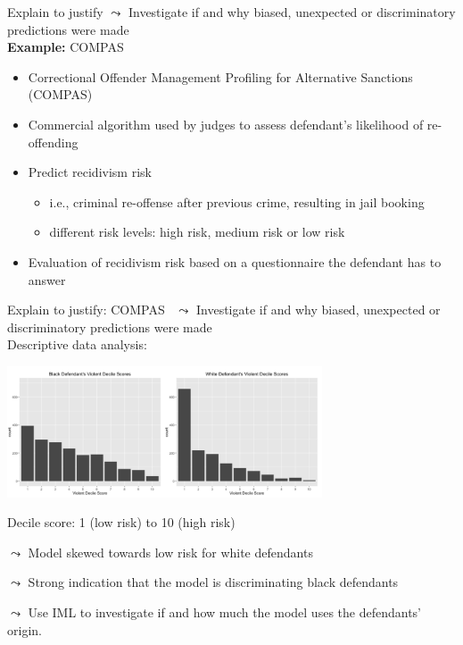 \documentclass[11pt,compress,t,notes=noshow, aspectratio=169, xcolor=table]{beamer}
\begin{document}
\begin{frame}{Explain to justify}
    $\leadsto$ Investigate if and why biased, unexpected or discriminatory predictions were made \\
    \bigskip
    \textbf{Example:} COMPAS
    \smallskip
    \begin{itemize}
        \item Correctional Offender Management Profiling for Alternative Sanctions (COMPAS)
        \smallskip
        \item Commercial algorithm used by judges to assess defendant’s likelihood of re-offending
        \pause
        \smallskip
        \item Predict recidivism risk
        \begin{itemize}
            \item i.e., criminal re-offense after previous crime, resulting in jail booking
            \smallskip
            \item different risk levels: high risk, medium risk or low risk
        \end{itemize}
        \pause
        \smallskip
        \item Evaluation of recidivism risk based on a questionnaire the defendant has to answer
    \end{itemize}

\end{frame}

\begin{frame}{Explain to justify: COMPAS~}
    $\leadsto$ Investigate if and why biased, unexpected or discriminatory predictions were made \\
    \medskip
    Descriptive data analysis: 
    
    \centering
    \includegraphics[width=0.7\textwidth]{figure/compass_black_white.PNG}

    Decile score: 1 (low risk) to 10 (high risk)

	$\leadsto$ Model skewed towards low risk for white defendants
	
	$\leadsto$ Strong indication that the model is discriminating black defendants
	
	$\leadsto$ Use IML to investigate if and how much the model uses the defendants' origin.
\end{frame}
\end{document}
